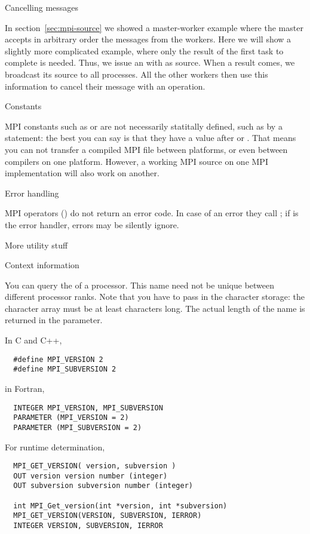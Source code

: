 
 {Cancelling messages}

In section~\ref{sec:mpi-source} we showed a master-worker example where the 
master accepts in arbitrary order the messages from the workers.
Here we will show a slightly
more complicated example, where only the result of the first task to
complete is needed. Thus, we issue an 
with  as source.  When a result comes, we
broadcast its source to all processes.  All the other workers then use
this information to cancel their message with
an  operation.


 {Constants}

MPI constants such as  or  are not
necessarily statitally defined, such as by a  statement:
the best you can say is that they have a value after
 or .
That means you can not transfer a compiled MPI file between
platforms, or even between compilers on one platform.
However, a working MPI source on one MPI implementation
will also work on another.

 {Error handling}

MPI operators () do not return an error code. In case of
an error they call ; if 
is the error handler, errors may be silently ignore.

 {More utility stuff}

 {Context information}

You can query the  of a processor.
This name need not be unique between different processor ranks.
%
%
Note that you have to pass in the character storage:
the character array must be at least  characters long.
The actual length of the name is returned in the  parameter.

In C and C++,
\begin{verbatim}
  #define MPI_VERSION 2
  #define MPI_SUBVERSION 2
\end{verbatim}
in Fortran,
\begin{verbatim}
  INTEGER MPI_VERSION, MPI_SUBVERSION
  PARAMETER (MPI_VERSION = 2)
  PARAMETER (MPI_SUBVERSION = 2)
\end{verbatim}
For runtime determination,
\begin{verbatim}
  MPI_GET_VERSION( version, subversion )
  OUT version version number (integer)
  OUT subversion subversion number (integer)

  int MPI_Get_version(int *version, int *subversion)
  MPI_GET_VERSION(VERSION, SUBVERSION, IERROR)
  INTEGER VERSION, SUBVERSION, IERROR
\end{verbatim}

